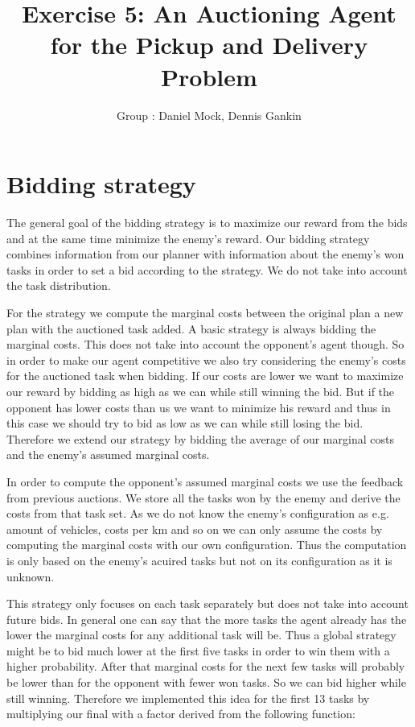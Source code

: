 \documentclass[11pt]{article}
\title{\bf Exercise 5: An Auctioning Agent for the Pickup and Delivery Problem}
\author{Group \textnumero: Daniel Mock, Dennis Gankin}
\begin{document}
\maketitle

\section{Bidding strategy}
The general goal of the bidding strategy is to maximize our reward from the bids and at the same time minimize the enemy's reward.
Our bidding strategy combines information from our planner with information about the enemy's won tasks in order to set a bid according to the strategy.
We do not take into account the task distribution.

For the strategy we compute the marginal costs between the original plan a new plan with the auctioned task added. A basic strategy is always bidding the marginal costs. This does not take into account the opponent's agent though. So in order to make our agent competitive we also try considering the enemy's costs for the auctioned task when bidding. If our costs are lower we want to maximize our reward by bidding as high as we can while still winning the bid. But if the opponent has lower costs than us we want to minimize his reward and thus in this case we should try to bid as low as we can while still losing the bid. Therefore we extend our strategy by bidding the average of our marginal costs and the enemy's assumed marginal costs.

In order to compute the opponent's assumed marginal costs we use the feedback from previous auctions. We store all the tasks won by the enemy and derive the costs from that task set. As we do not know the enemy's configuration as e.g. amount of vehicles, costs per km and so on we can only assume the costs by computing the marginal costs with our own configuration. Thus the computation is only based on the enemy's acuired tasks but not on its configuration as it is unknown. 

This strategy only focuses on each task separately but does not take into account future bids. In general one can say that the more tasks the agent already has the lower the marginal costs for any additional task will be. Thus a global strategy might be to bid much lower at the first five tasks in order to win them with a higher probability. After that marginal costs for the next few tasks will probably be lower than for the opponent with fewer won tasks. So we can bid higher while still winning. Therefore we implemented this idea for the first 13 tasks by multiplying our final with a factor derived from the following function: 
\end{document}
